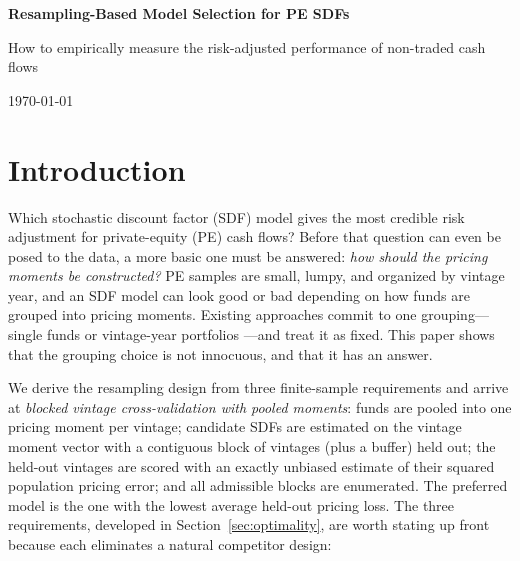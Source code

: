 \documentclass[11pt]{article}
\begin{document}
{\Large\bfseries Resampling-Based Model Selection for PE SDFs\par}
{\normalsize How to empirically measure the risk-adjusted performance of non-traded cash flows\par}
\today

\section{Introduction}
\label{sec:intro}

Which stochastic discount factor (SDF) model gives the most credible risk adjustment for private-equity (PE) cash flows? Before that question can even be posed to the data, a more basic one must be answered: \emph{how should the pricing moments be constructed?} PE samples are small, lumpy, and organized by vintage year, and an SDF model can look good or bad depending on how funds are grouped into pricing moments. Existing approaches commit to one grouping---single funds \citep{AngChenGoetzmannPhalippou2018} or vintage-year portfolios \citep{DriessenLinPhalippou2012}---and treat it as fixed. This paper shows that the grouping choice is not innocuous, and that it has an answer.

We derive the resampling design from three finite-sample requirements and arrive at \emph{blocked vintage cross-validation with pooled moments}: funds are pooled into one pricing moment per vintage; candidate SDFs are estimated on the vintage moment vector with a contiguous block of vintages (plus a buffer) held out; the held-out vintages are scored with an exactly unbiased estimate of their squared population pricing error; and all admissible blocks are enumerated. The preferred model is the one with the lowest average held-out pricing loss. The three requirements, developed in Section~\ref{sec:optimality}, are worth stating up front because each eliminates a natural competitor design:
\end{document}

